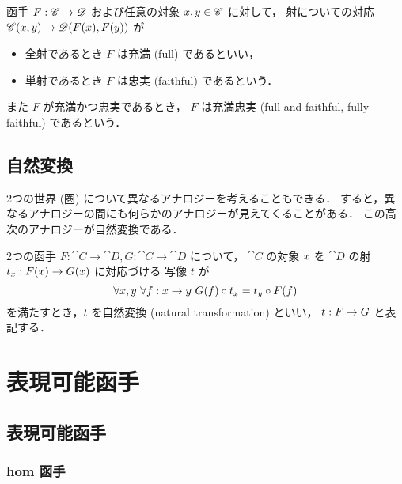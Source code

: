 \documentclass[titlepage]{ltjsreport}
\begin{document}
\begin{definition}[充満，忠実，充満忠実]
  \def\C{\cat{C}}%
  \def\D{\cat{D}}%
  \def\x{\obj{x}}%
  \def\y{\obj{y}}%
  函手 $\mrp{F}{\C}{\D}$ および任意の対象 $\x,\y\in\objs{\C}$ に対して，
  射についての対応 $\mrps{\C}{\x}{\y}\to\mrps{\D}{F(\x)}{F(\y)}$ が
  \begin{itemize}
    \item 全射であるとき $F$ は充満 (full) であるといい，
    \item 単射であるとき $F$ は忠実 (faithful) であるという．
  \end{itemize}
  また $F$ が充満かつ忠実であるとき，
  $F$ は充満忠実 (full and faithful, fully faithful) であるという．
\end{definition}

\section{自然変換}

2つの世界 (圏) について異なるアナロジーを考えることもできる．
すると，異なるアナロジーの間にも何らかのアナロジーが見えてくることがある．
この高次のアナロジーが自然変換である．

\begin{definition}[自然変換]
  \def\x{\obj{x}}%
  \def\y{\obj{y}}%
  2つの函手 $F:\cat{C}\to\cat{D},G:\cat{C}\to\cat{D}$ について，
  $\cat{C}$ の対象 $\x$ を $\cat{D}$ の射 $t_{\x}:F(\x)\to G(\x)$ に対応づける
  写像 $t$ が
  \begin{equation}
    \forall\x,\y\ \forall\mrp{f}{\x}{\y}\ G(f)\circ t_{\x}=t_{\y}\circ F(f)
  \end{equation}
  を満たすとき，$t$ を自然変換 (natural transformation) といい，
  ${t}:{F}\to{G}$ と表記する．
  \begin{center}
    
  \end{center}
\end{definition}

\chapter{表現可能函手}

\section{表現可能函手}

\subsection{hom 函手}
\end{document}
